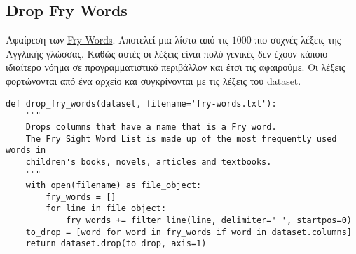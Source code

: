 \subsection{Drop Fry Words}
Αφαίρεση των \href{http://www.k12reader.com/subject/vocabulary/fry-words/}{Fry Words}.
Αποτελεί μια λίστα από τις $1000$ πιο συχνές λέξεις της Αγγλικής γλώσσας.
Καθώς αυτές οι λέξεις είναι πολύ γενικές δεν έχουν κάποιο ιδιαίτερο νόημα σε προγραμματιστικό περιβάλλον και έτσι τις αφαιρούμε.
Οι λέξεις φορτώνονται από ένα αρχείο και συγκρίνονται με τις λέξεις του dataset.
\begin{lstlisting}[captionpos=none, numbers=none, breaklines=true]
def drop_fry_words(dataset, filename='fry-words.txt'):
    """
    Drops columns that have a name that is a Fry word.
    The Fry Sight Word List is made up of the most frequently used words in
    children's books, novels, articles and textbooks.
    """
    with open(filename) as file_object:
        fry_words = []
        for line in file_object:
            fry_words += filter_line(line, delimiter=' ', startpos=0)
    to_drop = [word for word in fry_words if word in dataset.columns]
    return dataset.drop(to_drop, axis=1)
\end{lstlisting}